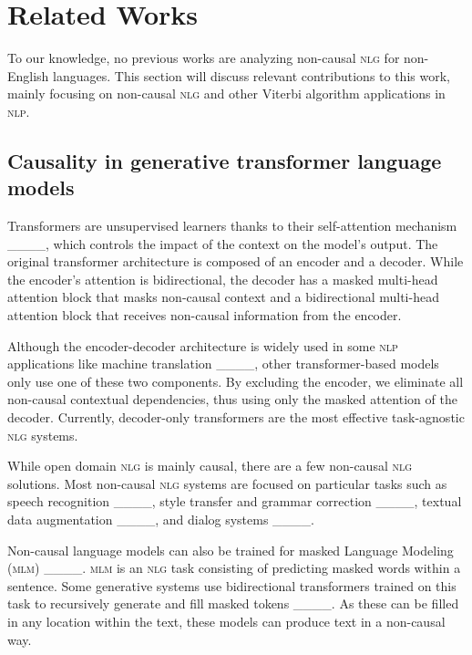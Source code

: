 \section{Related Works}
\label{sec:related}

To our knowledge, no previous works are analyzing non-causal \textsc{nlg} for non-English languages. This section will discuss relevant contributions to this work, mainly focusing on non-causal \textsc{nlg} and other Viterbi algorithm applications in \textsc{nlp}.

\subsection{Causality in generative transformer language models}
\label{sec:noncausal_related}

Transformers are unsupervised learners thanks to their self-attention mechanism ____, which controls the impact of the context on the model's output. The original transformer architecture is composed of an encoder and a decoder. While the encoder's attention is bidirectional, the decoder has a masked multi-head attention block that masks non-causal context and a bidirectional multi-head attention block that receives non-causal information from the encoder.

Although the encoder-decoder architecture is widely used in some \textsc{nlp} applications like machine translation ____, other transformer-based models only use one of these two components. By excluding the encoder, we eliminate all non-causal contextual dependencies, thus using only the masked attention of the decoder. Currently, decoder-only transformers are the most effective task-agnostic \textsc{nlg} systems.

While open domain \textsc{nlg} is mainly causal, there are a few non-causal \textsc{nlg} solutions. Most non-causal \textsc{nlg} systems are focused on particular tasks such as speech recognition ____, style transfer and grammar correction ____, textual data augmentation ____, and dialog systems ____.

Non-causal language models can also be trained for masked Language Modeling (\textsc{mlm}) ____. \textsc{mlm} is an \textsc{nlg} task consisting of predicting masked words within a sentence. Some generative systems use bidirectional transformers trained on this task to recursively generate and fill masked tokens ____. As these can be filled in any location within the text, these models can produce text in a non-causal way.


